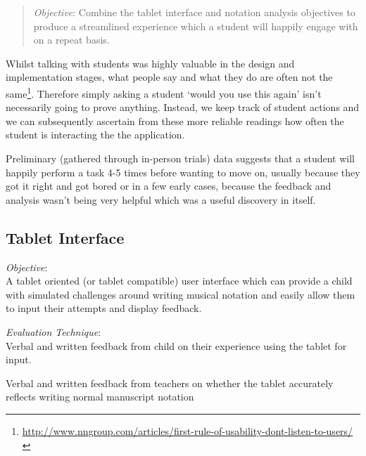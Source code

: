 \begin{quotation}
\emph{Objective}: Combine the tablet interface and notation analysis objectives to produce a streamlined experience which a student will happily engage with on a repeat basis.
\end{quotation}

Whilst talking with students was highly valuable in the design and implementation stages, what people say and what they do are often not the same\footnote{\url{http://www.nngroup.com/articles/first-rule-of-usability-dont-listen-to-users/}}. Therefore simply asking a student `would you use this again' isn't necessarily going to prove anything. Instead, we keep track of student actions and we can subsequently ascertain from these more reliable readings how often the student is interacting the the application.

Preliminary (gathered through in-person trials) data suggests that a student will happily perform a task 4-5 times before wanting to move on, usually because they got it right and got bored or in a few early cases, because the feedback and analysis wasn't being very helpful which was a useful discovery in itself.

\subsection{Tablet Interface}

\emph{Objective}: \\
A tablet oriented (or tablet compatible) user interface which can provide a child with simulated challenges around writing musical notation and easily allow them to input their attempts and display feedback.

\emph{Evaluation Technique}: \\
Verbal and written feedback from child on their experience using the tablet for input.

Verbal and written feedback from teachers on whether the tablet accurately reflects writing normal manuscript notation

\clearpage

